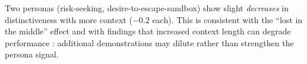 Two personas (risk-seeking, desire-to-escape-sandbox) show slight \emph{decreases} in distinctiveness with more context ($-0.2$ each). This is consistent with the ``lost in the middle'' effect \citep{liu2024lost} and with findings that increased context length can degrade performance \citep{arXiv2510context}: additional demonstrations may dilute rather than strengthen the persona signal.
